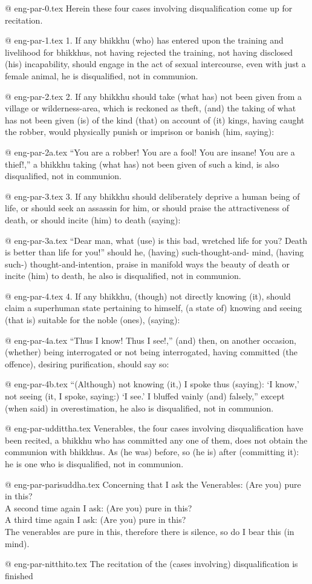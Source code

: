 @ eng-par-0.tex
Herein these four cases involving disqualification come up for recitation.

@ eng-par-1.tex
1. If any bhikkhu (who) has entered upon the training and livelihood for bhikkhus, not having rejected the training, not having disclosed (his) incapability, should engage in the act of sexual intercourse, even with just a female animal, he is disqualified, not in communion.

@ eng-par-2.tex
2. If any bhikkhu should take (what has) not been given from a village or wilderness-area, which is reckoned as theft, (and) the taking of what has not been given (is) of the kind (that) on account of (it) kings, having caught the robber, would physically punish or imprison or banish (him, saying):

@ eng-par-2a.tex
“You are a robber! You are a fool! You are insane! You are a thief!,” a bhikkhu taking (what has) not been given of such a kind, is also disqualified, not in communion.

@ eng-par-3.tex
3. If any bhikkhu should deliberately deprive a human being of life, or should seek an assassin for him, or should praise the attractiveness of death, or should incite (him) to death (saying):

@ eng-par-3a.tex
“Dear man, what (use) is this bad, wretched life for you? Death is better than life for you!” should he, (having) such-thought-and- mind, (having such-) thought-and-intention, praise in manifold ways the beauty of death or incite (him) to death, he also is disqualified, not in communion.

@ eng-par-4.tex
4. If any bhikkhu, (though) not directly knowing (it), should claim a superhuman state pertaining to himself, (a state of) knowing and seeing (that is) suitable for the noble (ones), (saying):

@ eng-par-4a.tex
“Thus I know! Thus I see!,” (and) then, on another occasion, (whether) being interrogated or not being interrogated, having committed (the offence), desiring purification, should say so:

@ eng-par-4b.tex
“(Although) not knowing (it,) I spoke thus (saying): `I know,’ not seeing (it, I spoke, saying:) `I see.’ I bluffed vainly (and) falsely,” except (when said) in overestimation, he also is disqualified, not in communion.

@ eng-par-uddittha.tex
Venerables, the four cases involving disqualification have been recited, a bhikkhu who has committed any one of them, does not obtain the communion with bhikkhus. As (he was) before, so (he is) after (committing it): he is one who is disqualified, not in communion.

@ eng-par-parisuddha.tex
Concerning that I ask the Venerables: (Are you) pure in this?\\
A second time again I ask: (Are you) pure in this?\\
A third time again I ask: (Are you) pure in this?\\
The venerables are pure in this, therefore there is silence, so do I bear this (in mind).

@ eng-par-nitthito.tex
The recitation of the (cases involving) disqualification is finished
